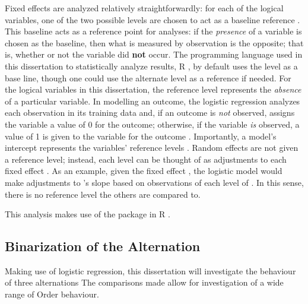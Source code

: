 Fixed effects are analyzed relatively straightforwardly: for each of the logical variables, one of the two possible levels are chosen to act as a baseline reference \citep{baayen2012mixed}. This baseline acts as a reference point for analyses: if the \textit{presence} of a variable is chosen as the baseline, then what is measured by observation is the opposite; that is, whether or not the variable did \textbf{not} occur. The programming language used in this dissertation to statistically analyze results, R \citep{R}, by default uses the  level as a base line, though one could use the alternate level as a reference if needed. For the logical variables in this dissertation,  the reference level represents the \textit{absence} of a particular variable. In modelling an outcome, the logistic regression analyzes each observation in its training data and, if an outcome is \textit{not} observed, assigns the variable a value of 0 for the outcome; otherwise, if the variable \textit{is} observed, a value of 1 is given to the variable for the outcome \cite{baayen2012mixed}. Importantly, a model's intercept represents the variables' reference levels \citep{baayen2012mixed}. Random effects are not given a reference level; instead, each level can be thought of as adjustments to each fixed effect \citep{baayen2012mixed}. As an example, given the fixed effect , the logistic model would make adjustments to 's slope based on observations of each level of . In this sense, there is no reference level the others are compared to. 

This analysis makes use of the  package in R \citep{lme4}.


\subsection{Binarization of the Alternation}
Making use of logistic regression, this dissertation will investigate the behaviour of three alternations The comparisons made allow for investigation of a wide range of Order behaviour.

